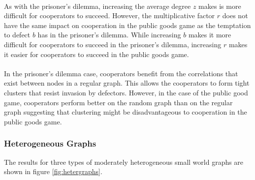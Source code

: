 \documentclass{article}
\begin{document}
	\paragraph{}As with the prisoner’s dilemma, increasing the average degree $z$ makes is more difficult for cooperators to succeed.  However, the multiplicative factor $r$ does not have the same impact on cooperation in the public goods game as the temptation to defect $b$ has in the prisoner's dilemma.  While increasing $b$ makes it more difficult for cooperators to succeed in the prisoner's dilemma, increasing $r$ makes it easier for cooperators to succeed in the public goods game.
	\paragraph{}In the prisoner's dilemma case, cooperators benefit from the correlations that exist between nodes in a regular graph.  This allows the cooperators to form tight clusters that resist invasion by defectors.  However, in the case of the public good game, cooperators perform better on the random graph than on the regular graph suggesting that clustering might be disadvantageous to cooperation in the public goods game.

	\subsubsection{Heterogeneous Graphs}
    The results for three types of moderately heterogeneous small world graphs are shown in figure \ref{fig:hetergraphs}.
\end{document}

